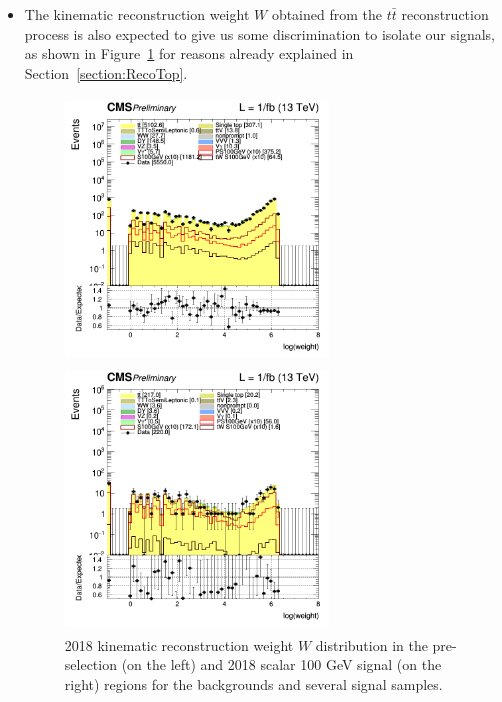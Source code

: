 \documentclass[a4paper, 10pt, openright]{report}
\begin{document}
\begin{itemize}
\item The kinematic reconstruction weight $W$ obtained from the $t \bar t$ reconstruction process is also expected to give us some discrimination to isolate our signals, as shown in Figure~\ref{fig:SRdisc5} for reasons already explained in Section~\ref{section:RecoTop}.

\begin{figure}[htbp]
\centering
\begin{minipage}[b]{.48\textwidth}
\includegraphics[width=7cm, height=7cm]{figs/log_cratio_topCR_ll_2j_signal1_reco_weight.png}
\end{minipage}\hfill
\begin{minipage}[b]{.48\textwidth}
\includegraphics[width=7cm, height=7cm]{figs/log_cratio_topCR_ll_2j_signal0_reco_weight.png}
\end{minipage} \hfill
\caption{2018 kinematic reconstruction weight $W$ distribution in the pre-selection (on the left) and 2018 scalar 100 GeV signal (on the right) regions for the backgrounds and several signal samples.}
\label{fig:SRdisc5}
\end{figure}


\end{itemize}
\end{document}
